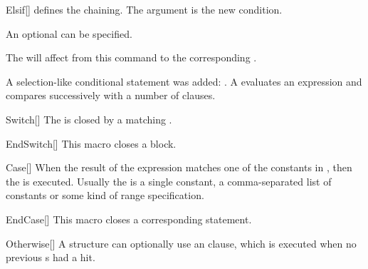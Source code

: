 \documentclass[a4paper, 11pt]{article}
\begin{document}
\begin{macro}{Elsif}[]
     defines the  chaining. The argument  is the new condition.

    An optional  can be specified.

    The  will affect from this command to the corresponding .
\end{macro}

A selection-like conditional statement was added: . A  evaluates an expression and compares successively with a number of  clauses.

\begin{macro}{Switch}[]
    The  is closed by a matching .

    \BlockOptions
\end{macro}

\begin{macro}{EndSwitch}[]
    This macro closes a  block.

    \StatementOptions
\end{macro}

\begin{macro}{Case}[]
    When the result of the  expression matches one of the constants in , then the  is executed. Usually the  is a single constant, a comma-separated list of constants or some kind of range specification.

    \BlockOptions
\end{macro}

\begin{macro}{EndCase}[]
    This macro closes a corresponding  statement.

    \StatementOptions
\end{macro}

\begin{macro}{Otherwise}[]
    A  structure can optionally use an  clause, which is executed when no previous s had a hit.

    \BlockOptions
\end{macro}
\end{document}
